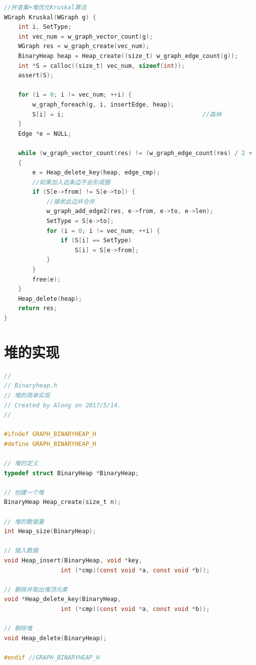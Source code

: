 \documentclass[a4paper,10pt]{ctexart}
\begin{document}
\begin{lstlisting}[language={C}]
//并查集+堆优化Kruskal算法
WGraph Kruskal(WGraph g) {
    int i, SetType;
    int vec_num = w_graph_vector_count(g);
    WGraph res = w_graph_create(vec_num);
    BinaryHeap heap = Heap_create((size_t) w_graph_edge_count(g));
    int *S = calloc((size_t) vec_num, sizeof(int));
    assert(S);

    for (i = 0; i != vec_num; ++i) {
        w_graph_foreach(g, i, insertEdge, heap);
        S[i] = i;                                       //森林
    }
    Edge *e = NULL;

    while (w_graph_vector_count(res) != (w_graph_edge_count(res) / 2 + 1))
    {
        e = Heap_delete_key(heap, edge_cmp);
        //如果加入这条边不会形成圈
        if (S[e->from] != S[e->to]) {
            //接收此边并合并
            w_graph_add_edge2(res, e->from, e->to, e->len);
            SetType = S[e->to];
            for (i = 0; i != vec_num; ++i) {
                if (S[i] == SetType)
                    S[i] = S[e->from];
            }
        }
        free(e);
    }
    Heap_delete(heap);
    return res;
}

\end{lstlisting}

\section{堆的实现}
\begin{lstlisting}[language={C}]
//
// Binaryheap.h
// 堆的简单实现
// Created by Along on 2017/5/14.
//

#ifndef GRAPH_BINARYHEAP_H
#define GRAPH_BINARYHEAP_H

// 堆的定义
typedef struct BinaryHeap *BinaryHeap;

// 创建一个堆
BinaryHeap Heap_create(size_t n);

// 堆的数据量
int Heap_size(BinaryHeap);

// 插入数据
void Heap_insert(BinaryHeap, void *key,
                int (*cmp)(const void *a, const void *b));

// 删除并取出堆顶元素
void *Heap_delete_key(BinaryHeap,
                int (*cmp)(const void *a, const void *b));

// 删除堆
void Heap_delete(BinaryHeap);

#endif //GRAPH_BINARYHEAP_H
\end{lstlisting}
\end{document}

